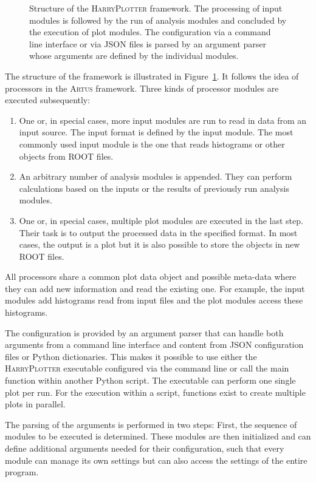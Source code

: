 \documentclass[3p]{elsarticle}
\newcommand{\software}[1]{\textsc{#1}\xspace}
\newcommand{\artus}{\software{Artus}}
\newcommand{\harryplotter}{\software{HarryPlotter}}
\begin{document}
\begin{figure}[htb]
\centering 
\caption{Structure of the \harryplotter framework.
The processing of input modules is followed by the run of analysis modules and concluded by the execution of plot modules.
The configuration via a command line interface or via JSON files is parsed by an argument parser whose arguments are defined by the individual modules.}
\label{figure_artus_harry_plotter}
\end{figure}

The structure of the framework is illustrated in Figure~\ref{figure_artus_harry_plotter}.
It follows the idea of processors in the \artus framework.
Three kinds of processor modules are executed subsequently:
\begin{enumerate}
\item One or, in special cases, more input modules are run to read in data from an input source.
The input format is defined by the input module.
The most commonly used input module is the one that reads histograms or other objects from ROOT files.
\item An arbitrary number of analysis modules is appended.
They can perform calculations based on the inputs or the results of previously run analysis modules.
\item One or, in special cases, multiple plot modules are executed in the last step.
Their task is to output the processed data in the specified format.
In most cases, the output is a plot but it is also possible to store the objects in new ROOT files.
\end{enumerate}
All processors share a common plot data object and possible meta-data where they can add new information and read the existing one.
For example, the input modules add histograms read from input files and the plot modules access these histograms.

The configuration is provided by an argument parser that can handle both arguments from a command line interface and content from JSON configuration files or Python dictionaries.
This makes it possible to use either the \harryplotter executable configured via the command line or call the main function within another Python script.
The executable can perform one single plot per run.
For the execution within a script, functions exist to create multiple plots in parallel.

The parsing of the arguments is performed in two steps:
First, the sequence of modules to be executed is determined.
These modules are then initialized and can define additional arguments needed for their configuration, such that every module can manage its own settings but can also access the settings of the entire program.
\end{document}
